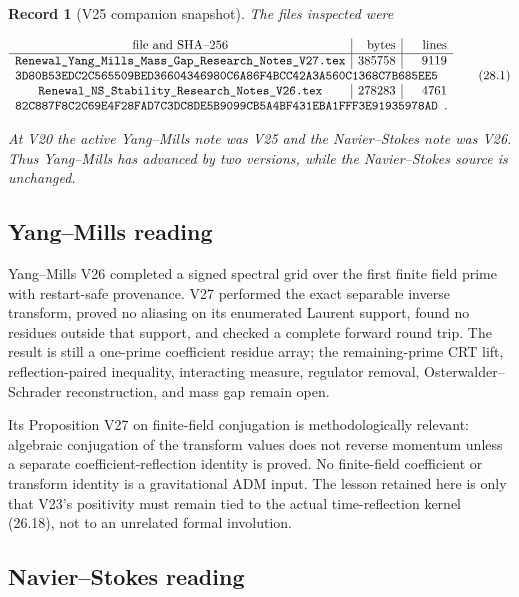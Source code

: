 \documentclass[11pt]{article}
\newtheorem{record}[theorem]{Record}
\theoremstyle{remark}
\begin{document}
\begin{record}[V25 companion snapshot]
\label{rec:v19v25-snapshot}
The files inspected were

\[
\begin{array}{c|r|r}
\hbox{file and SHA--256}&\hbox{bytes}&\hbox{lines}\\ \hline
\texttt{Renewal\_Yang\_Mills\_Mass\_Gap\_Research\_Notes\_V27.tex}
&385758&9119\\
\multicolumn{3}{l}{
\texttt{3D80B53EDC2C565509BED36604346980C6A86F4BCC42A3A560C1368C7B685EE5}}
\\
\texttt{Renewal\_NS\_Stability\_Research\_Notes\_V26.tex}
&278283&4761\\
\multicolumn{3}{l}{
\texttt{82C887F8C2C69E4F28FAD7C3DC8DE5B9099CB5A4BF431EBA1FFF3E91935978AD}}.
\end{array}                                                     \tag{28.1}
\]

At V20 the active Yang--Mills note was V25 and the Navier--Stokes note
was V26.  Thus Yang--Mills has advanced by two versions, while the
Navier--Stokes source is unchanged.
\end{record}

\subsection{Yang--Mills reading}

Yang--Mills V26 completed a signed spectral grid over the first finite
field prime with restart-safe provenance.  V27 performed the exact
separable inverse transform, proved no aliasing on its enumerated Laurent
support, found no residues outside that support, and checked a complete
forward round trip.  The result is still a one-prime coefficient residue
array; the remaining-prime CRT lift, reflection-paired inequality,
interacting measure, regulator removal, Osterwalder--Schrader
reconstruction, and mass gap remain open.

Its Proposition V27 on finite-field conjugation is methodologically
relevant: algebraic conjugation of the transform values does not reverse
momentum unless a separate coefficient-reflection identity is proved.
No finite-field coefficient or transform identity is a gravitational ADM
input.  The lesson retained here is only that V23's positivity must remain
tied to the actual time-reflection kernel (26.18), not to an unrelated
formal involution.

\subsection{Navier--Stokes reading}
\end{document}
